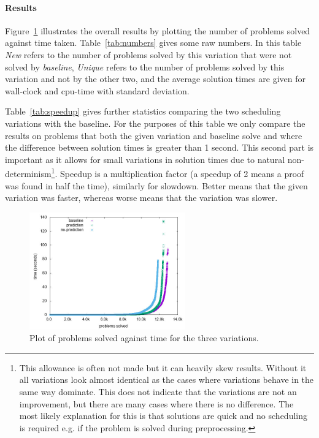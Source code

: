 \documentclass{llncs}
\begin{document}
\paragraph{Results} Figure~\ref{fig:results} illustrates the overall results by plotting the number of problems solved against time taken. Table~\ref{tab:numbers} gives some raw numbers. In this table \emph{New} refers to the number of problems solved by this variation that were not solved by \emph{baseline}, \emph{Unique} refers to the number of problems solved by this variation and not by the other two, and the average solution times are given for wall-clock and cpu-time with standard deviation. 

Table~\ref{tab:speedup} gives further statistics comparing the two scheduling variations with the baseline. For the purposes of this table we only compare the results on problems that both the given variation and baseline solve and where the difference between solution times is greater than 1 second. This second part is important as it allows for small variations in solution times due to natural non-determinism\footnote{This allowance is often not made but it can heavily skew results. Without it all variations look almost identical as the cases where variations behave in the same way dominate. This does not indicate that the variations are not an improvement, but there are many cases where there is no difference. The most likely explanation for this is that solutions are quick and no scheduling is required e.g. if the problem is solved during preprocessing.}. Speedup is a multiplication factor (a speedup of 2 means a proof was found in half the time), similarly for slowdown. Better means that the given variation was faster, whereas worse means that the variation was slower.

\begin{figure}[t]
\centering
\includegraphics[width=0.6\textwidth]{results.jpeg}
\caption{Plot of problems solved against time for the three variations.\label{fig:results}}
\end{figure}
\end{document}
